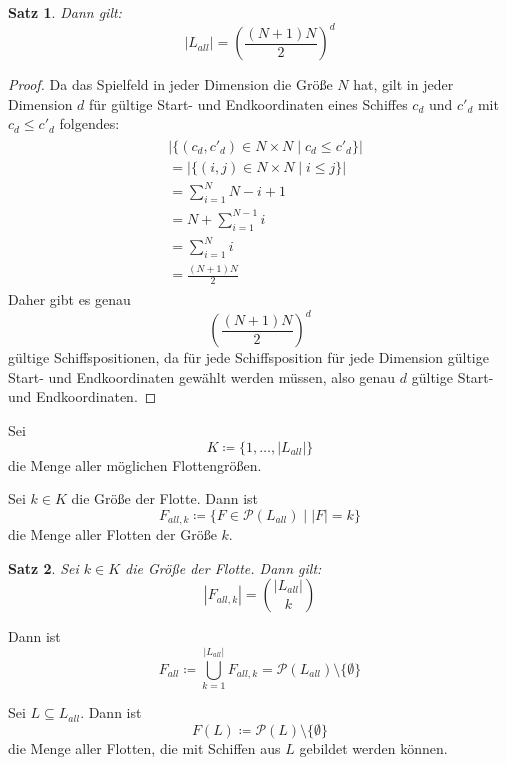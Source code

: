 \documentclass[a4paper,12pt]{llncs}
\numberwithin{equation}{section}
\newtheorem{satz}{Satz}
\begin{document}
\begin{satz}
Dann gilt:
\[
|L_{all}|=\left(\frac{(N+1) N}{2}\right)^d
\]
\end{satz}

\begin{proof}
Da das Spielfeld in jeder Dimension die Größe $N$ hat, gilt in jeder Dimension $d$ für gültige Start- und Endkoordinaten eines Schiffes $c_d$ und $c'_d$ mit $c_d \leq c'_d$ folgendes:
\begin{align}
\begin{split}
&|\{(c_d, c'_d) \in N \times N \mid c_d \leq c'_d\}|\\
&=|\{(i, j) \in N \times N \mid i \leq j\}|\\
&=\sum_{i=1}^N N - i + 1\\
&=N + \sum_{i=1}^{N-1} i\\
&=\sum_{i=1}^{N} i\\
&= \frac{(N + 1) N}{2}
\nonumber
\end{split}
\end{align}
Daher gibt es genau
\[
\left(\frac{(N+1) N}{2}\right)^d
\]
gültige Schiffspositionen, da für jede Schiffsposition für jede Dimension gültige Start- und Endkoordinaten gewählt werden müssen, also genau $d$ gültige Start- und Endkoordinaten.
\end{proof}

\begin{definition}
Sei 
\[
K \coloneqq \{1, \dots, |L_{all}|\}
\]
die Menge aller möglichen Flottengrößen.
\end{definition}

\begin{definition}
Sei $k \in K$ die Größe der Flotte.
Dann ist
\[
F_{all,k} \coloneqq\{F \in \mathcal{P}(L_{all}) \mid |F| = k\}
\]
die Menge aller Flotten der Größe $k$.
\end{definition}

\begin{satz}
Sei $k \in K$ die Größe der Flotte.
Dann gilt:
\[
|F_{all,k}|=\binom{|L_{all}|}{k}
\]
\end{satz}

\begin{definition}
Dann ist
\[
F_{all} \coloneqq \bigcup_{k=1}^{|L_{all}|} F_{all,k} = \mathcal{P}(L_{all}) \setminus \{\emptyset\}
\]
\end{definition}

\begin{definition}
Sei $L \subseteq L_{all}$.
Dann ist
\[
F(L) \coloneqq \mathcal{P}(L) \setminus \{\emptyset\}
\]
die Menge aller Flotten, die mit Schiffen aus $L$ gebildet werden können.
\end{definition}
\end{document}
